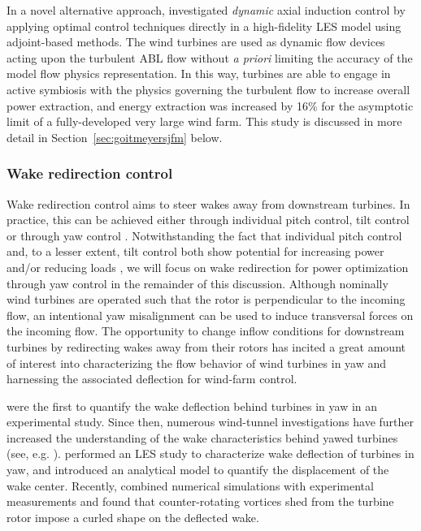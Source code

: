 In a novel alternative approach, \cite{goit2015optimal} investigated \emph{dynamic} axial induction control by applying optimal control techniques directly in a high-fidelity LES model using adjoint-based methods. The wind turbines are used as dynamic flow devices acting upon the turbulent ABL flow without \emph{a priori} limiting the accuracy of the model flow physics representation. In this way, turbines are able to engage in active symbiosis with the physics governing the turbulent flow to increase overall power extraction, and energy extraction was increased by 16\% for the asymptotic limit of a fully-developed very large wind farm. This study is discussed in more detail in Section~\ref{sec:goitmeyersjfm} below.
\clearpage
\subsubsection{Wake redirection control}
Wake redirection control aims to steer wakes away from downstream turbines. In practice, this can be achieved either through individual pitch control, tilt control or through yaw control \citep{fleming2014evaluating}. Notwithstanding the fact that individual pitch control and, to a lesser extent, tilt control both show potential for increasing power and/or reducing loads \citep{bossanyi2003individual,fleming2015simulation,verhulst2015altering}, we will focus on wake redirection for power optimization through yaw control in the remainder of this discussion. Although nominally wind turbines are operated such that the rotor is perpendicular to the incoming flow, an intentional yaw misalignment can be used to induce transversal forces on the incoming flow. The opportunity to change inflow conditions for downstream turbines by redirecting wakes away from their rotors has incited a great amount of interest into characterizing the flow behavior of wind turbines in yaw and harnessing the associated deflection for wind-farm control. 

\cite{clayton1982measured} were the first to quantify the wake deflection behind turbines in yaw in an experimental study. Since then, numerous wind-tunnel investigations have further increased the understanding of the wake characteristics behind yawed turbines (see, e.g. \citealp{grant1997optical, medici2008measurements, bastankhah2016experimental}). \cite{jimenez2010application} performed an LES study to characterize wake deflection of turbines in yaw, and introduced an analytical model to quantify the displacement of the wake center. Recently, \cite{howland2016wake} combined numerical simulations with experimental measurements and found that counter-rotating vortices shed from the turbine rotor impose a curled shape on the deflected wake. 

